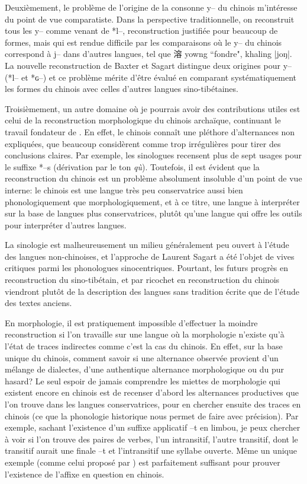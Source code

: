 \documentclass[oldfontcommands,oneside,a4paper,11pt]{memoir}
\newcommand{\ipa}[1]{{\phon #1}} %
\newcommand{\zh}[1]{{\cn #1}}
\begin{document}
Deuxièmement, le problème de l'origine de la consonne \ipa{y--} du chinois m'intéresse du point de vue comparatiste. Dans la perspective traditionnelle, on reconstruit tous les y-- comme venant de *l--, reconstruction justifiée pour beaucoup de formes, mais qui est rendue difficile par les comparaisons où le \ipa{y--} du chinois correspond  à j-- dans d'autres langues, tel que \zh{溶} yowng ``fondre", khaling |joŋ|.  La nouvelle reconstruction de Baxter et Sagart distingue deux origines pour \ipa{y--} (*l-- et *ɢ--) et ce problème mérite d'être évalué en comparant systématiquement les formes du chinois avec celles d'autres langues sino-tibétaines.


Troisièmement, un autre domaine où je pourrais avoir des contributions utiles est celui de la reconstruction morphologique du chinois archaïque, continuant le travail fondateur de \citet{sagart99roc}. En effet, le chinois connaît une pléthore d'alternances non expliquées, que beaucoup   considèrent   comme trop irrégulières pour tirer des conclusions claires. Par exemple, les sinologues recensent plus de sept usages pour le suffixe *--s (dérivation par le ton \textit{qù}). Toutefois, il est évident que la reconstruction du chinois est un problème absolument insoluble d'un point de vue interne: le chinois est une langue très peu conservatrice aussi bien phonologiquement que morphologiquement, et à ce titre, une langue à interpréter sur la base de langues plus conservatrices, plutôt qu'une langue qui offre les outils pour interpréter d'autres langues. 

La sinologie est malheureusement un milieu généralement peu ouvert à l'étude des langues non-chinoises, et l'approche de Laurent Sagart a été l'objet de vives critiques parmi les phonologues sinocentriques.   Pourtant, les futurs  progrès en reconstruction du sino-tibétain, et par ricochet en reconstruction du chinois viendront plutôt de la description des langues sans tradition écrite que de l'étude des textes anciens. 
 


En morphologie, il est pratiquement impossible d'effectuer la moindre reconstruction si l'on travaille sur une langue où la morphologie n'existe qu'à l'état de traces indirectes comme c'est la cas du chinois. En effet, sur la base unique du chinois, comment savoir si une alternance observée provient d'un mélange de dialectes, d'une authentique alternance morphologique ou du pur hasard? Le seul espoir de jamais comprendre les miettes de morphologie qui existent encore en chinois est de recenser d'abord les alternances productives que l'on trouve dans les langues  conservatrices, pour  en chercher ensuite des traces en chinois (ce que la phonologie historique nous permet de faire avec précision). Par exemple, sachant l'existence d'un suffixe applicatif --t en limbou, je peux chercher à voir si l'on trouve des paires de verbes, l'un intransitif, l'autre transitif, dont le transitif aurait une finale --t et l'intransitif une syllabe ouverte. Même un unique exemple (comme celui proposé par \citet{sagart04directions}) est parfaitement suffisant pour prouver l'existence de l'affixe en question en chinois. 
\end{document}
